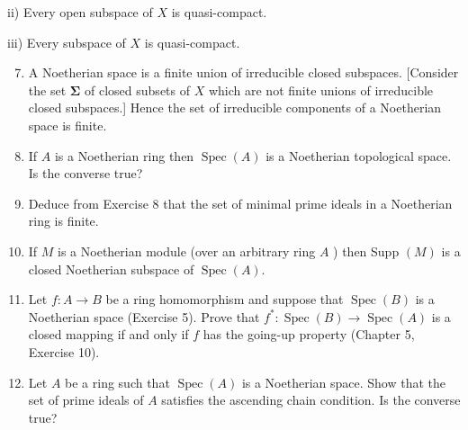 \documentclass{standalone}
\theoremstyle{definition}
\theoremstyle{remark}
\begin{document}
ii) Every open subspace of $X$ is quasi-compact.

iii) Every subspace of $X$ is quasi-compact.

\begin{enumerate}
  \setcounter{enumi}{6}
  \item A Noetherian space is a finite union of irreducible closed subspaces. [Consider the set $\boldsymbol{\Sigma}$ of closed subsets of $X$ which are not finite unions of irreducible closed subspaces.] Hence the set of irreducible components of a Noetherian space is finite.

  \item If $A$ is a Noetherian ring then $\operatorname{Spec}(A)$ is a Noetherian topological space. Is the converse true?

  \item Deduce from Exercise 8 that the set of minimal prime ideals in a Noetherian ring is finite.

  \item If $M$ is a Noetherian module (over an arbitrary ring $A$ ) then Supp $(M)$ is a closed Noetherian subspace of $\operatorname{Spec}(A)$.

  \item Let $f: A \rightarrow B$ be a ring homomorphism and suppose that $\operatorname{Spec}(B)$ is a Noetherian space (Exercise 5). Prove that $f^{*}: \operatorname{Spec}(B) \rightarrow \operatorname{Spec}(A)$ is a closed mapping if and only if $f$ has the going-up property (Chapter 5, Exercise 10).

  \item Let $A$ be a ring such that $\operatorname{Spec}(A)$ is a Noetherian space. Show that the set of prime ideals of $A$ satisfies the ascending chain condition. Is the converse true?

\end{enumerate}
\end{document}
